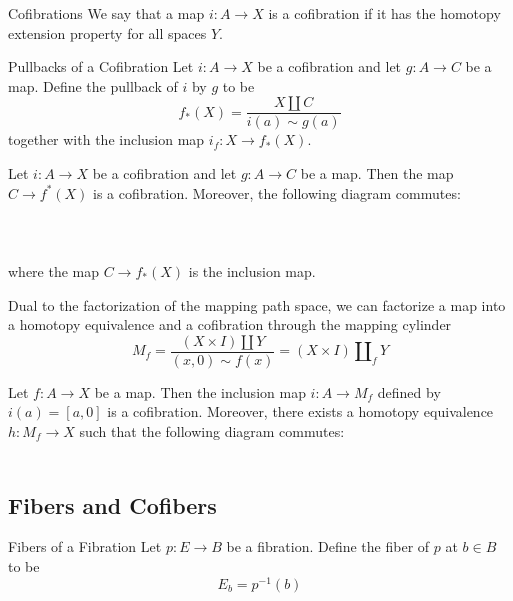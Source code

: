 \documentclass[a4paper]{article}
\begin{document}
\begin{defn}{Cofibrations}{} We say that a map $i:A\to X$ is a cofibration if it has the homotopy extension property for all spaces $Y$. 
\end{defn}

\begin{defn}{Pullbacks of a Cofibration}{} Let $i:A\to X$ be a cofibration and let $g:A\to C$ be a map. Define the pullback of $i$ by $g$ to be $$f_\ast(X)=\frac{X\amalg C}{i(a)\sim g(a)}$$ together with the inclusion map $i_f:X\to f_\ast(X)$. 
\end{defn}

\begin{prp}{}{} Let $i:A\to X$ be a cofibration and let $g:A\to C$ be a map. Then the map $C\to f^\ast(X)$ is a cofibration. Moreover, the following diagram commutes: \\~\\
\\~\\
where the map $C\to f_\ast(X)$ is the inclusion map. 
\end{prp}

Dual to the factorization of the mapping path space, we can factorize a map into a homotopy equivalence and a cofibration through the mapping cylinder $$M_f=\frac{(X\times I)\amalg Y}{(x,0)\sim f(x)}=(X\times I)\amalg_fY$$

\begin{thm}{}{} Let $f:A\to X$ be a map. Then the inclusion map $i:A\to M_f$ defined by $i(a)=[a,0]$ is a cofibration. Moreover, there exists a homotopy equivalence $h:M_f\to X$ such that the following diagram commutes: \\~\\
\end{thm}

\subsection{Fibers and Cofibers}
\begin{defn}{Fibers of a Fibration}{} Let $p:E\to B$ be a fibration. Define the fiber of $p$ at $b\in B$ to be $$E_b=p^{-1}(b)$$
\end{defn}
\end{document}
